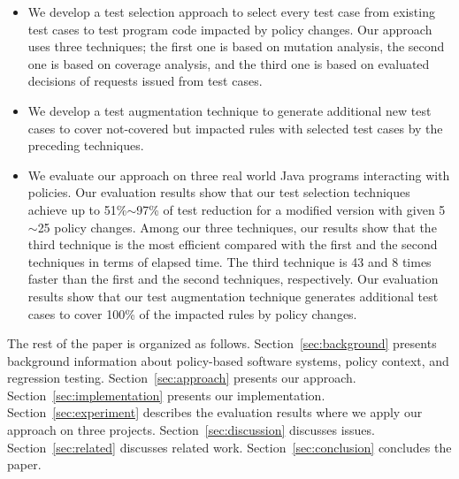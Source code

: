 \begin{itemize}
  \item We develop a test selection approach to select every test case from existing test cases to test program code impacted by policy changes. Our approach
  uses three techniques; the first one is based on mutation analysis, the second one is based on coverage analysis, and the third one is based on evaluated 
decisions of requests issued from test cases. 
  \item We develop a test augmentation technique to generate additional new test cases to cover not-covered but impacted rules with selected test cases by the preceding techniques.

  \item We evaluate our approach on three real world Java programs interacting with policies. Our evaluation results show that our test selection techniques achieve
 up to 51\%$\sim$97\% of test reduction for a modified version with given 5$\sim$25 policy changes. Among our three techniques, our results show that the 
third technique is the most efficient compared with the first
  and the second techniques in terms of elapsed time. The third technique is 43 and 8 times
faster than the first and the second techniques, respectively. Our evaluation results show that our test augmentation technique generates additional test cases to cover 100\% of the impacted rules by policy changes.
\end{itemize}

The rest of the paper is organized as follows.
Section~\ref{sec:background} presents background information about
policy-based software systems, policy context, and regression testing.
Section~\ref{sec:approach} presents our approach.
Section~\ref{sec:implementation} presents our implementation. 
Section~\ref{sec:experiment} describes the evaluation results
where we apply our approach on three projects.
Section~\ref{sec:discussion} discusses issues. 
Section~\ref{sec:related} discusses related
work. Section~\ref{sec:conclusion}
concludes the paper.
